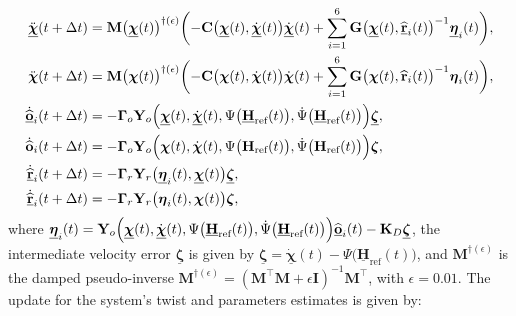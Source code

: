 \begin{align}
    \begin{split}
        \ddot{\underline{\boldsymbol{\chi}}}(t+\Delta t) &= \mathbf{M}\bigl(\underline{\boldsymbol{\chi}}(t)\bigr)^{\dagger(\epsilon)}\biggl(-\mathbf{C}\bigl(\underline{\boldsymbol{\chi}}(t), \underline{\dot{\boldsymbol{\chi}}}(t)\bigr)\underline{\dot{\boldsymbol{\chi}}}(t)  + \sum_{i=1}^6 \mathbf{G}\bigl(\underline{\boldsymbol{\chi}}(t), \underline{\widehat{\mathbf{r}}}_i(t)\bigr)^{-1}\underline{\boldsymbol{\eta}}_i(t)\biggr),\\
        \ddot{{\boldsymbol{\chi}}}(t+\Delta t) &= \mathbf{M}\bigl({\boldsymbol{\chi}}(t)\bigr)^{\dagger(\epsilon)}\biggl(-\mathbf{C}\bigl({\boldsymbol{\chi}}(t), {\dot{\boldsymbol{\chi}}}(t)\bigr)\dot{\boldsymbol{\chi}}(t)  + \sum_{i=1}^6 \mathbf{G}\bigl({\boldsymbol{\chi}}(t), {\widehat{\mathbf{r}}}_i(t)\bigr)^{-1}{\boldsymbol{\eta}}_i(t)\biggr),\\
        \underline{\dot{\widehat{\mathbf{o}}}}_i(t + \Delta t) &= -\boldsymbol{\Gamma}_o\mathbf{Y}_o\Bigl(\underline{\boldsymbol{\chi}}(t), \underline{\dot{\boldsymbol{\chi}}}(t), \Psi\bigl(\underline{\mathbf{H}}_\text{ref}(t)\bigr), \dot{\Psi}\bigl(\underline{\mathbf{H}}_\text{ref}(t)\bigr)\Bigr)\underline{\boldsymbol{\zeta}},\\
        {\dot{\widehat{\mathbf{o}}}}_i(t + \Delta t) &= -\boldsymbol{\Gamma}_o\mathbf{Y}_o\Bigl({\boldsymbol{\chi}}(t), {\dot{\boldsymbol{\chi}}}(t), \Psi\bigl({\mathbf{H}_\text{ref}}(t)\bigr), \dot{\Psi}\bigl({\mathbf{H}_\text{ref}}(t)\bigr)\Bigr){\boldsymbol{\zeta}},\\
        \underline{\dot{\widehat{\mathbf{r}}}}_i(t + \Delta t) &= -\boldsymbol{\Gamma}_r\mathbf{Y}_r\bigl(\underline{\boldsymbol{\eta}}_i(t), \underline{\boldsymbol{\chi}}(t)\bigr)\underline{\boldsymbol{\zeta}},\\
        \underline{\dot{\widehat{\mathbf{r}}}}_i(t + \Delta t) &= -\boldsymbol{\Gamma}_r\mathbf{Y}_r\bigl({\boldsymbol{\eta}}_i(t), {\boldsymbol{\chi}}(t)\bigr){\boldsymbol{\zeta}},
    \end{split}
\end{align}
where $\underline{\boldsymbol{\eta}}_i(t) = \mathbf{Y}_o\Bigl(\underline{\boldsymbol{\chi}}(t), \underline{\dot{\boldsymbol{\chi}}}(t), \Psi\bigl(\underline{\mathbf{H}}_\text{ref}(t)\bigr), \dot{\Psi}\bigl(\underline{\mathbf{H}}_\text{ref}(t)\bigr)\Bigr)\underline{\widehat{\mathbf{o}}}_i(t) - \mathbf{K}_D\underline{\boldsymbol{\zeta}}$, the intermediate velocity error $\underline{\boldsymbol{\zeta}}$ is given by $\underline{\boldsymbol{\zeta}}=\underline{\dot{\boldsymbol{\chi}}}(t) - \Psi\bigl(\underline{\mathbf{H}}_\text{ref}(t)\bigr)$, and $\mathbf{M}^{\dagger(\epsilon)}$ is the damped pseudo-inverse $\mathbf{M}^{\dagger(\epsilon)} = (\mathbf{M}^\top\mathbf{M} + \epsilon\mathbf{I})^{-1}\mathbf{M}^\top$, with $\epsilon=0.01$. The update for the system's twist and parameters estimates is given by:
